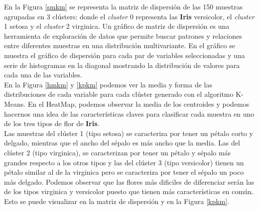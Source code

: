 \documentclass[a4paper, 20pt]{article}
\begin{document}
{En la Figura \ref{smkm} se representa la matriz de dispersión de las 150 muestras agrupadas en 3 clústers: donde el \textit{cluster} 0 representa las \textbf{Iris} versicolor, el \textit{cluster} 1 setosa y el \textit{cluster} 2 virginica. Un gráfico de matriz de dispersión es una herramienta de exploración de datos que permite buscar patrones y relaciones entre diferentes muestras en una distribución multivariante. En el gráfico se muestra el gráfico de dispersión para cada par de variables seleccionadas y una serie de histogramas en la diagonal mostrando la distribución de valores para cada una de las variables.\\

En la Figura \ref{hmkm} y \ref{kpkm} podemos ver la media y forma de las distribuciones de cada variable para cada clúster generado con el algoritmo K-Means. En el HeatMap, podemos observar la media de los centroides y podemos hacernos una idea de las características claves para clasificar cada muestra en uno de los tres tipos de flor de \textbf{Iris}.\\

Las muestras del clúster 1 (tipo setosa) se caracteriza por tener un pétalo corto y delgado, mientras que el ancho del sépalo es más ancho que la media. Las del clúster 2 (tipo virginica), se caracterizan por tener un pétalo y sépalo más grandes respecto a los otros tipos y las del clúster 3 (tipo versicolor) tienen un pétalo similar al de la virginica pero se caracteriza por tener el sépalo un poco más delgado. Podemos observar que las flores más dificiles de diferenciar serán las de los tipos virginica y versicolor puesto que tienen más características en común. Esto se puede visualizar en la matriz de dispersión y en la Figura \ref{kpkm}.

}
\end{document}

